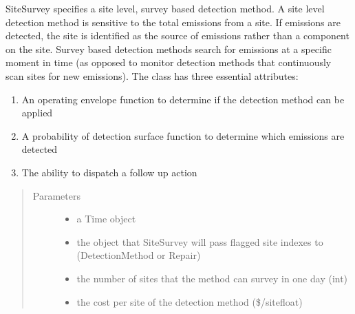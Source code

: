 \documentclass[letterpaper,10pt,english]{sphinxmanual}
\begin{document}
\begin{fulllineitems}
\label{\detokenize{index:feast.DetectionModules.site_survey.SiteSurvey}}
SiteSurvey specifies a site level, survey based detection method. A site level detection method is sensitive to
the total emissions from a site. If emissions are detected, the site is identified as the source of emissions
rather than a component on the site. Survey based detection methods search for emissions at a specific moment in
time (as opposed to monitor detection methods that continuously scan sites for new emissions).
The class has three essential attributes:
\begin{enumerate}
%
\item {} 
An operating envelope function to determine if the detection method can be applied

\item {} 
A probability of detection surface function to determine which emissions are detected

\item {} 
The ability to dispatch a follow up action

\end{enumerate}
\begin{quote}\begin{description}
\item[{Parameters}] \leavevmode\begin{itemize}
\item {} 
 \textendash{} a Time object

\item {} 
 \textendash{} the object that SiteSurvey will pass flagged site indexes to (DetectionMethod or Repair)

\item {} 
 \textendash{} the number of sites that the method can survey in one day (int)

\item {} 
 \textendash{} the cost per site of the detection method (\$/site\textendash{}float)


\end{itemize}
\end{description}
\end{quote}
\end{fulllineitems}
\end{document}
